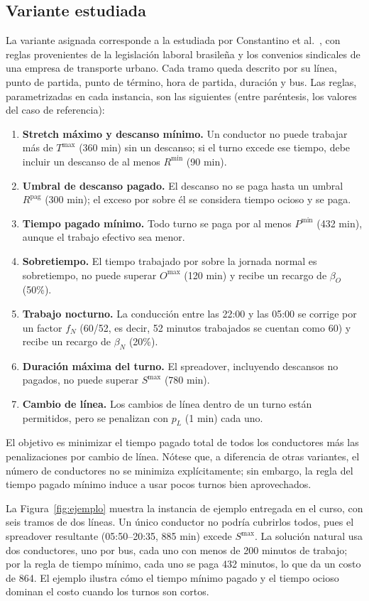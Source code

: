 \documentclass[letter, 10pt]{article}
\begin{document}
\subsection{Variante estudiada}\label{sec:variante}
La variante asignada corresponde a la estudiada por Constantino et al.~\cite{Constantino2017}, con reglas provenientes de la legislación laboral brasileña y los convenios sindicales de una empresa de transporte urbano. Cada tramo queda descrito por su línea, punto de partida, punto de término, hora de partida, duración y bus. Las reglas, parametrizadas en cada instancia, son las siguientes (entre paréntesis, los valores del caso de referencia):
\begin{enumerate}
\item \textbf{Stretch máximo y descanso mínimo.} Un conductor no puede trabajar más de $T^{\max}$ (360 min) sin un descanso; si el turno excede ese tiempo, debe incluir un descanso de al menos $R^{\min}$ (90 min).
\item \textbf{Umbral de descanso pagado.} El descanso no se paga hasta un umbral $R^{\text{pag}}$ (300 min); el exceso por sobre él se considera tiempo ocioso y se paga.
\item \textbf{Tiempo pagado mínimo.} Todo turno se paga por al menos $P^{\min}$ (432 min), aunque el trabajo efectivo sea menor.
\item \textbf{Sobretiempo.} El tiempo trabajado por sobre la jornada normal es sobretiempo, no puede superar $O^{\max}$ (120 min) y recibe un recargo de $\beta_O$ (50\%).
\item \textbf{Trabajo nocturno.} La conducción entre las 22:00 y las 05:00 se corrige por un factor $f_N$ (60/52, es decir, 52 minutos trabajados se cuentan como 60) y recibe un recargo de $\beta_N$ (20\%).
\item \textbf{Duración máxima del turno.} El spreadover, incluyendo descansos no pagados, no puede superar $S^{\max}$ (780 min).
\item \textbf{Cambio de línea.} Los cambios de línea dentro de un turno están permitidos, pero se penalizan con $p_L$ (1 min) cada uno.
\end{enumerate}
El objetivo es minimizar el tiempo pagado total de todos los conductores más las penalizaciones por cambio de línea. Nótese que, a diferencia de otras variantes, el número de conductores no se minimiza explícitamente; sin embargo, la regla del tiempo pagado mínimo induce a usar pocos turnos bien aprovechados.

La Figura~\ref{fig:ejemplo} muestra la instancia de ejemplo entregada en el curso, con seis tramos de dos líneas. Un único conductor no podría cubrirlos todos, pues el spreadover resultante (05:50--20:35, 885 min) excede $S^{\max}$. La solución natural usa dos conductores, uno por bus, cada uno con menos de 200 minutos de trabajo; por la regla de tiempo mínimo, cada uno se paga 432 minutos, lo que da un costo de 864. El ejemplo ilustra cómo el tiempo mínimo pagado y el tiempo ocioso dominan el costo cuando los turnos son cortos.
\end{document}
